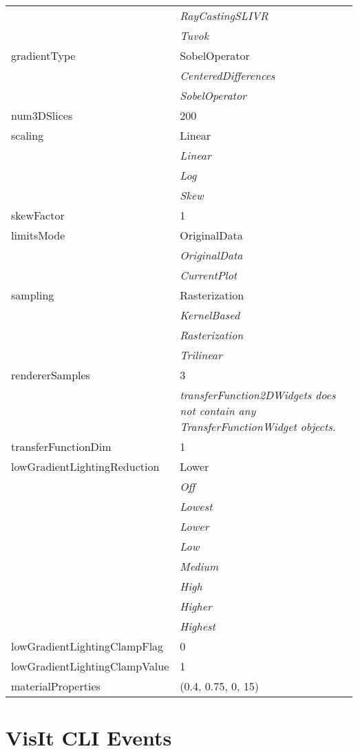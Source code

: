 \documentclass[10pt,a4paper]{report}
\begin{document}
\begin{longtable}{lp{7.5cm}}
 & {\it  RayCastingSLIVR} \\
 & {\it  Tuvok} \\
gradientType  &  SobelOperator   \\
 & {\it  CenteredDifferences} \\
 & {\it  SobelOperator} \\
num3DSlices  &  200 \\
scaling  &  Linear   \\
 & {\it  Linear} \\
 & {\it  Log} \\
 & {\it  Skew} \\
skewFactor  &  1 \\
limitsMode  &  OriginalData   \\
 & {\it  OriginalData} \\
 & {\it  CurrentPlot} \\
sampling  &  Rasterization   \\
 & {\it  KernelBased} \\
 & {\it  Rasterization} \\
 & {\it  Trilinear} \\
rendererSamples  &  3 \\
 & {\it transferFunction2DWidgets does not contain any TransferFunctionWidget objects.} \\
transferFunctionDim  &  1 \\
lowGradientLightingReduction  &  Lower   \\
 & {\it  Off} \\
 & {\it  Lowest} \\
 & {\it  Lower} \\
 & {\it  Low} \\
 & {\it  Medium} \\
 & {\it  High} \\
 & {\it  Higher} \\
 & {\it  Highest} \\
lowGradientLightingClampFlag  &  0 \\
lowGradientLightingClampValue  &  1 \\
materialProperties  &  (0.4, 0.75, 0, 15) \\
\end{longtable}

\newpage
\newpage
\chapter{VisIt CLI Events}

\end{document}
